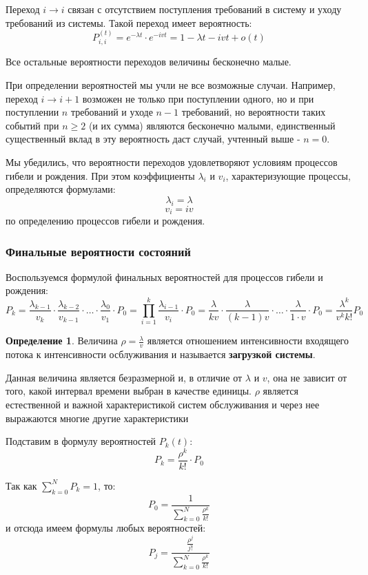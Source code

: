 \documentclass[aps,%
12pt,%
final,%
oneside,
onecolumn,%
musixtex, %
superscriptaddress,%
centertags]{article} %
\theoremstyle{plain}
\theoremstyle{definition}
\newtheorem{definition}{Определение}[subsection]
\theoremstyle{remark}
\begin{document}
Переход $i \to i$ связан с отсутствием поступления требований в систему и уходу требований из системы. Такой переход имеет вероятность:
$$P_{i,i}^{(t)} = e^{-\lambda t}\cdot e^{-ivt} = 1 - \lambda t - ivt +o(t)$$

Все остальные вероятности переходов величины бесконечно малые.

При определении вероятностей мы учли не все возможные случаи. Например, переход $i \to i +1$ возможен не только при поступлении одного, но и при поступлении $n$ требований и уходе $n-1$ требований, но вероятности таких событий при $n \geq 2$ (и их сумма) являются бесконечно малыми, единственный существенный вклад в эту вероятность даст случай, учтенный выше - $n=0$.

Мы убедились, что вероятности переходов удовлетворяют условиям процессов гибели и рождения. При этом коэффициенты $\lambda_i$ и $v_i$, характеризующие процессы, определяются формулами:
$$ \lambda_i  = \lambda$$
$$v_i = iv$$
по определению процессов гибели и рождения.

\subsubsection{Финальные вероятности состояний}

Воспользуемся формулой финальных вероятностей для процессов гибели и рождения:
$$P_k = \frac{\lambda_{k-1}}{v_k} \cdot \frac{\lambda_{k-2}}{v_{k-1}} \cdot \ldots \cdot \frac{\lambda_0}{v_1} \cdot P_0 = \prod_{i=1}^k \frac{\lambda_{i-1}}{v_i} \cdot P_0 = \frac{\lambda}{kv} \cdot \frac{\lambda}{(k-1)v} \cdot \ldots \cdot \frac{\lambda}{1\cdot v} \cdot P_0 = \frac{\lambda^k}{v^k k!} P_0$$

\begin{definition}
	Величина $\rho = \frac{\lambda}{v}$ является отношением интенсивности входящего потока к интенсивности осблуживания и называется \textbf{загрузкой системы}.

	Данная величина является безразмерной и, в отличие от $\lambda$ и $v$, она не зависит от того, какой интервал времени выбран в качестве единицы. $\rho$ является естественной и важной характеристикой систем обслуживания и через нее выражаются многие другие характеристики
\end{definition}

Подставим в формулу вероятностей $P_k(t)$:
$$P_k = \frac{\rho^k}{k!} \cdot P_0$$

Так как $\sum\limits_{k=0}^N P_k = 1$, то:
$$P_0 = \frac{1}{\sum\limits_{k=0}^N \frac{\rho^k}{k!}}$$
и отсюда имеем формулы любых вероятностей:
$$P_j = \frac{\frac{\rho^j}{j!}}{\sum\limits_{k=0}^N \frac{\rho^k}{k!}}$$
\end{document}
